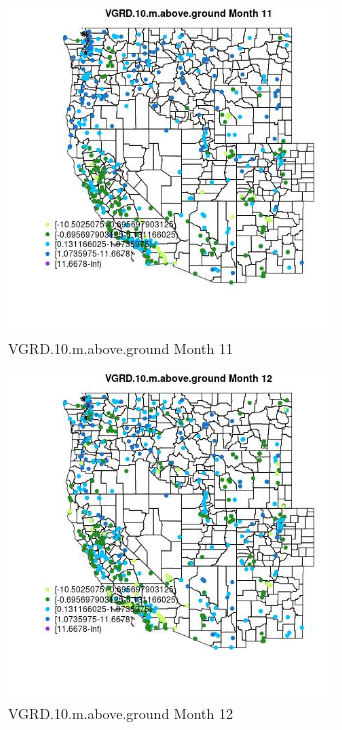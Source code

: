 \begin{figure} 
\centering  
\includegraphics[width=0.77\textwidth]{Code_Outputs/Report_ML_input_PM25_Step4_part_e_de_duplicated_aves_compiled_2019-05-14wNAs_MapObsMo11VGRD10maboveground.jpg} 
\caption{\label{fig:Report_ML_input_PM25_Step4_part_e_de_duplicated_aves_compiled_2019-05-14wNAsMapObsMo11VGRD10maboveground}VGRD.10.m.above.ground Month 11} 
\end{figure} 
 

\clearpage 

\begin{figure} 
\centering  
\includegraphics[width=0.77\textwidth]{Code_Outputs/Report_ML_input_PM25_Step4_part_e_de_duplicated_aves_compiled_2019-05-14wNAs_MapObsMo12VGRD10maboveground.jpg} 
\caption{\label{fig:Report_ML_input_PM25_Step4_part_e_de_duplicated_aves_compiled_2019-05-14wNAsMapObsMo12VGRD10maboveground}VGRD.10.m.above.ground Month 12} 
\end{figure} 
 

